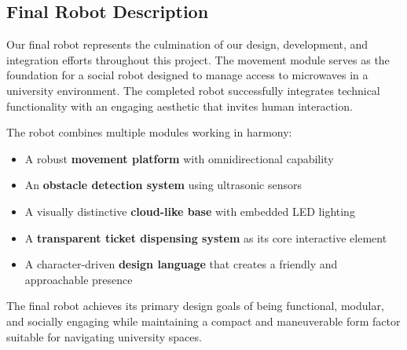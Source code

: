 \subsection{Final Robot Description}

Our final robot represents the culmination of our design, development, and integration efforts throughout this project. The movement module serves as the foundation for a social robot designed to manage access to microwaves in a university environment. The completed robot successfully integrates technical functionality with an engaging aesthetic that invites human interaction.

The robot combines multiple modules working in harmony:

\begin{itemize}
    \item A robust \textbf{movement platform} with omnidirectional capability
    \item An \textbf{obstacle detection system} using ultrasonic sensors
    \item A visually distinctive \textbf{cloud-like base} with embedded LED lighting
    \item A \textbf{transparent ticket dispensing system} as its core interactive element
    \item A character-driven \textbf{design language} that creates a friendly and approachable presence
\end{itemize}

The final robot achieves its primary design goals of being functional, modular, and socially engaging while maintaining a compact and maneuverable form factor suitable for navigating university spaces.
